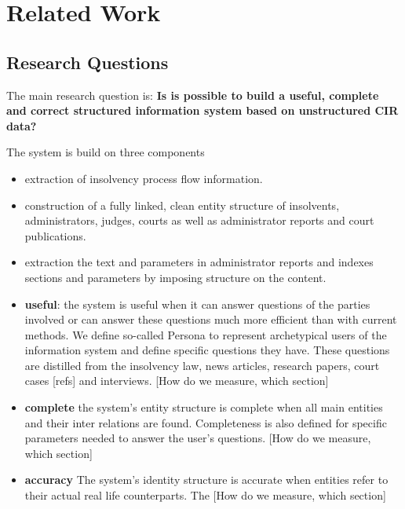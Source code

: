 \section{Related Work}

\subsection{Research Questions}
The main research question is:
\textbf{Is is possible to build a useful, complete and correct structured information system based on unstructured CIR data?}

The system is build on three components
\begin{itemize}
\item extraction of insolvency process flow information.
\item construction of a fully linked, clean entity structure of insolvents, administrators, judges, courts as well as administrator reports and court publications.
\item extraction the text and parameters in administrator reports and indexes sections and parameters by imposing structure on the content.
\end{itemize} 

\begin{itemize}
\item \textbf{useful}: the system is useful when it can answer questions of the parties involved or can answer these questions much more efficient than with current methods. We define so-called Persona to represent archetypical users of the information system and define specific questions they have. These questions are distilled from the insolvency law, news articles, research papers, court cases [refs] and interviews. [How do we measure, which section]
\item \textbf{complete} the system's entity structure is complete when all main entities and their inter relations are found. Completeness is also defined for specific parameters needed to answer the user's questions. [How do we measure, which section]
\item \textbf{accuracy} The system's identity structure is accurate when entities refer to their actual real life counterparts. The [How do we measure, which section]


\end{itemize}

